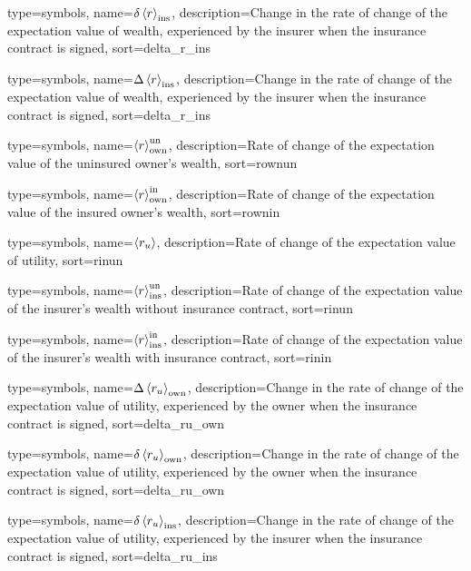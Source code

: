 {
 type={symbols}, 
 name={\ensuremath{\delta \ave{r}_{\text{ins}}}},
 description={Change in the rate of change of the expectation value of wealth, experienced by the insurer when the insurance contract is signed},
 sort=delta_r_ins
}

{
 type={symbols}, 
 name={\ensuremath{\Delta \ave{r}_{\text{ins}}}},
 description={Change in the rate of change of the expectation value of wealth, experienced by the insurer when the insurance contract is signed},
 sort=delta_r_ins
}

{
  type={symbols}, 
  name={\ensuremath{\ave{r}_{\text{own}}^{\text{un}}}},
  description={Rate of change of the expectation value of the uninsured owner's wealth},
  sort=rownun
}

{
  type={symbols}, 
  name={\ensuremath{\ave{r}_{\text{own}}^{\text{in}}}},
  description={Rate of change of the expectation value of the insured owner's wealth},
  sort=rownin
}

{
  type={symbols}, 
  name={\ensuremath{\ave{r_u}}},
  description={Rate of change of the expectation value of utility},
  sort=rinun
}

{
  type={symbols}, 
  name={\ensuremath{\ave{r}_{\text{ins}}^{\text{un}}}},
  description={Rate of change of the expectation value of the insurer's wealth without insurance contract},
  sort=rinun
}

{
  type={symbols}, 
  name={\ensuremath{\ave{r}_{\text{ins}}^{\text{in}}}},
  description={Rate of change of the expectation value of the insurer's wealth with insurance contract},
  sort=rinin
}






{
 type={symbols}, 
 name={\ensuremath{\Delta \ave{r_u}_{\text{own}}}},
 description={Change in the rate of change of the expectation value of utility, experienced by the owner when the insurance contract is signed},
 sort=delta_ru_own
}

{
 type={symbols}, 
 name={\ensuremath{\delta \ave{r_u}_{\text{own}}}},
 description={Change in the rate of change of the expectation value of utility, experienced by the owner when the insurance contract is signed},
 sort=delta_ru_own
}

{
 type={symbols}, 
 name={\ensuremath{\delta \ave{r_u}_{\text{ins}}}},
 description={Change in the rate of change of the expectation value of utility, experienced by the insurer when the insurance contract is signed},
 sort=delta_ru_ins
}

